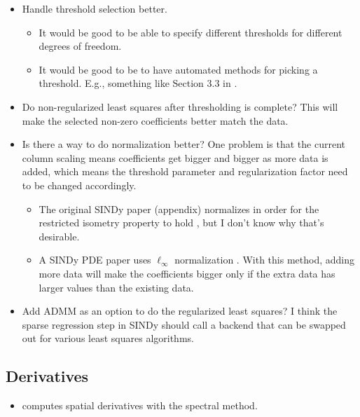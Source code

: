 \documentclass{article}
\begin{document}
\begin{itemize}
    \item Handle threshold selection better.
    \begin{itemize}
        \item It would be good to be able to specify different thresholds for
          different degrees of freedom.
        \item It would be good to be to have automated methods for picking a
          threshold. E.g., something like Section 3.3 in \cite{shea2020sindy-bvp}.
    \end{itemize}

    \item Do non-regularized least squares after thresholding is complete? This
      will make the selected non-zero coefficients better match the data.

    \item Is there a way to do normalization better? One problem is that the
      current column scaling means coefficients get bigger and bigger as more
      data is added, which means the threshold parameter and regularization
      factor need to be changed accordingly. 
    \begin{itemize}
        \item The original SINDy paper (appendix) normalizes in order for the
          restricted isometry property to hold \cite{brunton2016sindy}, but I
          don't know why that's desirable.
        \item A SINDy PDE paper uses $\ell_\infty$ normalization
          \cite{schaeffer2017sindy-pde2}. With this method, adding more data
          will make the coefficients bigger only if the extra data has larger
          values than the existing data.
    \end{itemize}

    \item Add ADMM as an option to do the regularized least squares? I think the
      sparse regression step in SINDy should call a backend that can be swapped
      out for various least squares algorithms.
\end{itemize}

\subsection{Derivatives}

\begin{itemize}
    \item \cite{schaeffer2017sindy-pde2} computes spatial derivatives with the spectral method.
\end{itemize}
\end{document}
